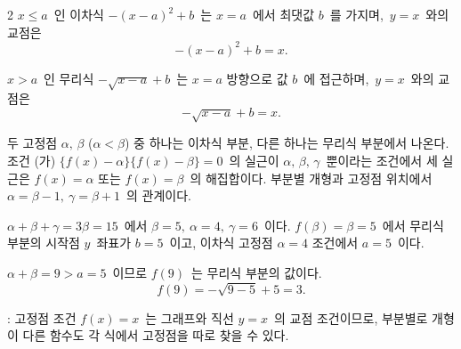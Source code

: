 \documentclass[10pt,fleqn]{article}
\begin{document}
\begin{multicols*}{2}
$x \le a$\ 인 이차식 $-(x-a)^{2}+b$\ 는 $x=a$\ 에서 최댓값 $b$\ 를 가지며,\ $y=x$\ 와의 교점은
\[ -(x-a)^{2}+b = x. \]

$x > a$\ 인 무리식 $-\sqrt{x-a}+b$\ 는 $x=a$ 방향으로 값 $b$\ 에 접근하며,\ $y=x$\ 와의 교점은
\[ -\sqrt{x-a}+b = x. \]

두 고정점 $\alpha,\, \beta$ ($\alpha < \beta$) 중 하나는 이차식 부분, 다른 하나는 무리식 부분에서 나온다. 조건 (가) $\{f(x)-\alpha\}\{f(x)-\beta\}=0$\ 의 실근이 $\alpha,\, \beta,\, \gamma$\ 뿐이라는 조건에서 세 실근은 $f(x)=\alpha$ 또는 $f(x)=\beta$\ 의 해집합이다. 부분별 개형과 고정점 위치에서 $\alpha = \beta-1,\ \gamma = \beta+1$\ 의 관계이다.

$\alpha+\beta+\gamma=3\beta=15$\ 에서 $\beta=5,\ \alpha=4,\ \gamma=6$\ 이다. $f(\beta)=\beta=5$\ 에서 무리식 부분의 시작점 $y$\ 좌표가 $b=5$\ 이고, 이차식 고정점 $\alpha=4$ 조건에서 $a=5$\ 이다.

$\alpha+\beta=9>a=5$\ 이므로 $f(9)$\ 는 무리식 부분의 값이다.
\[ f(9) = -\sqrt{9-5}+5 = 3. \]

\begin{dmcriticalpoint}
: 고정점 조건 $f(x)=x$\ 는 그래프와 직선 $y=x$\ 의 교점 조건이므로, 부분별로 개형이 다른 함수도 각 식에서 고정점을 따로 찾을 수 있다.
\end{dmcriticalpoint}

\end{multicols*}
\end{document}
